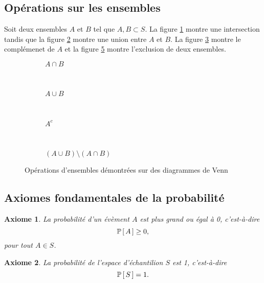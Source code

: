 \documentclass[11pt]{article}
\renewcommand\P[1]{%
	\ensuremath{%
		\mathbb{P}\left[\,#1\,\right]%
	}%
}%
\newtheorem{axiome}{Axiome}
\theoremstyle{remark}
\theoremstyle{definition}
\begin{document}
\subsection{Opérations sur les ensembles}
Soit deux ensembles $A$ et $B$ tel que $A,B\subset S$. La figure
\ref{fig:venn_intersection} montre une intersection tandis que la figure
\ref{fig:venn_union} montre une union entre $A$ et $B$. La figure
\ref{fig:venn_complement} montre le complémenet de $A$ et la figure
\ref{fig:venn_exclusion} montre l'exclusion de deux ensembles.

\begin{figure}[H]
	\centering
	\begin{subfigure}[H]{0.21\textwidth}
		\centering
		
		\caption{$A\cap B$}
		\label{fig:venn_intersection}
	\end{subfigure}
	~
	\begin{subfigure}[H]{0.21\textwidth}
		\centering
		
		\caption{$A\cup B$}
		\label{fig:venn_union}
	\end{subfigure}
	~
	\begin{subfigure}[H]{0.21\textwidth}
		\centering
		
		\caption{$A^c$}
		\label{fig:venn_complement}
	\end{subfigure}
	~
	\begin{subfigure}[H]{0.21\textwidth}
		\centering
		
		\caption{$\left(A\cup B\right)\setminus\left(A\cap B\right)$}
		\label{fig:venn_exclusion}
	\end{subfigure}
	\caption{Opérations d'ensembles démontrées sur des diagrammes de Venn}
\end{figure}

\subsection{Axiomes fondamentales de la probabilité}
\begin{axiome}
	La probabilité d'un évèment $A$ est plus grand ou égal à 0, c'est-à-dire
	\begin{equation*}
		\P{A}\geq 0,
	\end{equation*}
	pour tout $A\in S$.
\end{axiome}

\begin{axiome}
	La probabilité de l'espace d'échantilion $S$ est 1, c'est-à-dire
	\begin{equation*}
		\P{S}=1.
	\end{equation*}
\end{axiome}
\end{document}
